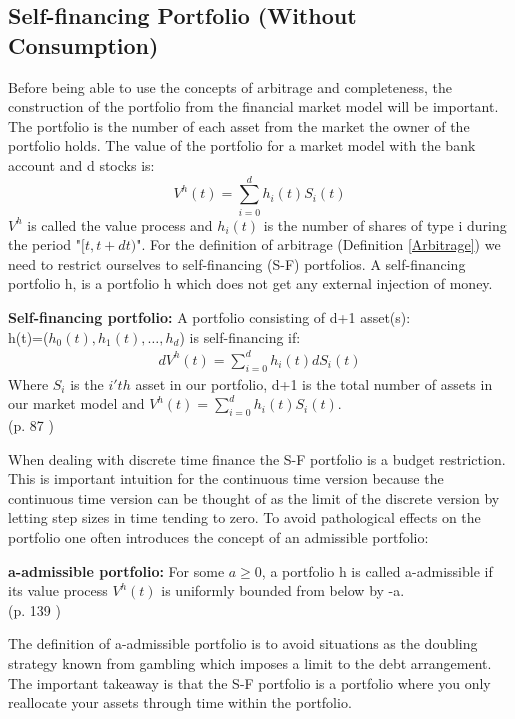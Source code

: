 \subsection{Self-financing Portfolio (Without Consumption)}
Before being able to use the concepts of arbitrage and completeness, the construction of the portfolio from the financial market model will be important. The portfolio is the number of each asset from the market the owner of the portfolio holds. The value of the portfolio for a market model with the bank account and d stocks is:
\begin{equation*}
V^h(t)=\sum_{i=0}^{d} h_{i}(t) S_i(t)
\end{equation*}
$V^h$ is called the value process and $h_i(t)$ is the number of shares of type i during the period "$[t,t+dt)$". For the definition of arbitrage (Definition \ref{Arbitrage}) we need to restrict ourselves to self-financing (S-F) portfolios. A self-financing portfolio h, is a portfolio h which does not get any external injection of money.
\theoremstyle{definition}
\begin{definition}{\textbf{Self-financing portfolio: }}
A portfolio consisting of d+1 asset(s): \\
h(t)=($h_0(t),h_1(t), \dotsc, h_{d}$) is self-financing if:
\begin{equation*}\label{SF}
\begin{split}
dV^{h}(t)=\sum_{i=0}^{d} h_{i}(t) dS_{i}(t)
\end{split}
\end{equation*}
Where $S_{i}$ is the $i'th$ asset in our portfolio, d+1 is the total number of assets in our market model and $V^{h}(t)=\sum_{i=0}^{d} h_{i}(t) S_{i}(t)$.\\ \null \hfill (p. 87 \parencite{finKont})
\end{definition}
When dealing with discrete time finance the S-F portfolio is a budget restriction. This is important intuition for the continuous time version because the continuous time version can be thought of as the limit of the discrete version by letting step sizes in time tending to zero. To avoid pathological effects on the portfolio one often introduces the concept of an admissible portfolio:
\theoremstyle{definition}
\begin{definition}{\textbf{a-admissible portfolio: }}
For some $a\geq 0$, a portfolio h is called a-admissible if its value process $V^h(t)$ is uniformly bounded from below by -a.\\
\null \hfill (p. 139 \parencite{finKont})
\end{definition}
The definition of a-admissible portfolio is to avoid situations as the doubling strategy known from gambling which imposes a limit to the debt arrangement. The important takeaway is that the S-F portfolio is a portfolio where you only reallocate your assets through time within the portfolio.


